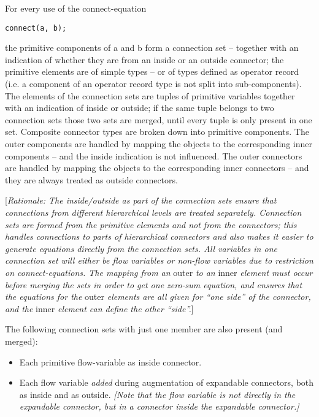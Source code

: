 For every use of the connect-equation
\begin{lstlisting}[language=modelica]
connect(a, b);
\end{lstlisting}

the primitive components of a and b form a connection set -- together
with an indication of whether they are from an inside or an outside
connector; the primitive elements are of simple types -- or of types
defined as operator record (i.e. a component of an operator record type
is not split into sub-components). The elements of the connection sets
are tuples of primitive variables together with an indication of inside
or outside; if the same tuple belongs to two connection sets those two
sets are merged, until every tuple is only present in one set. Composite
connector types are broken down into primitive components. The outer
components are handled by mapping the objects to the corresponding inner
components -- and the inside indication is not influenced. The outer
connectors are handled by mapping the objects to the corresponding inner
connectors -- and they are always treated as outside connectors.

{[}\emph{Rationale: The inside/outside as part of the connection sets
ensure that connections from different hierarchical levels are treated
separately. Connection sets are formed from the primitive elements and
not from the connectors; this handles connections to parts of
hierarchical connectors and also makes it easier to generate equations
directly from the connection sets. All variables in one connection set
will either be flow variables or non-flow variables due to restriction
on connect-equations. The mapping from an} outer \emph{to an} inner
\emph{element must occur before merging the sets in order to get one
zero-sum equation, and ensures that the equations for the} outer
\emph{elements are all given for ``one side'' of the connector, and the}
inner \emph{element can define the other ``side''.}{]}

The following connection sets with just one member are also present (and
merged):

\begin{itemize}
\item
  Each primitive flow-variable as inside connector.
\item
  Each flow variable \emph{added} during augmentation of expandable
  connectors, both as inside and as outside. \emph{{[}Note that the flow
  variable is not directly in the expandable connector, but in a
  connector inside the expandable connector.{]}}
\end{itemize}

